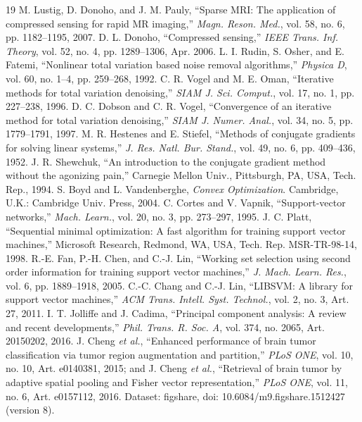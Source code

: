 \documentclass[conference,a4paper]{IEEEtran}
\newcommand{\etal}{\textit{et al.}}
\begin{document}
\begin{thebibliography}{19}
\scriptsize
{} M. Lustig, D. Donoho, and J. M. Pauly, ``Sparse MRI: The application of compressed sensing for rapid MR imaging,'' \emph{Magn. Reson. Med.}, vol. 58, no. 6, pp. 1182--1195, 2007.
 D. L. Donoho, ``Compressed sensing,'' \emph{IEEE Trans. Inf. Theory}, vol. 52, no. 4, pp. 1289--1306, Apr. 2006.
 L. I. Rudin, S. Osher, and E. Fatemi, ``Nonlinear total variation based noise removal algorithms,'' \emph{Physica D}, vol. 60, no. 1--4, pp. 259--268, 1992.
 C. R. Vogel and M. E. Oman, ``Iterative methods for total variation denoising,'' \emph{SIAM J. Sci. Comput.}, vol. 17, no. 1, pp. 227--238, 1996.
 D. C. Dobson and C. R. Vogel, ``Convergence of an iterative method for total variation denoising,'' \emph{SIAM J. Numer. Anal.}, vol. 34, no. 5, pp. 1779--1791, 1997.
 M. R. Hestenes and E. Stiefel, ``Methods of conjugate gradients for solving linear systems,'' \emph{J. Res. Natl. Bur. Stand.}, vol. 49, no. 6, pp. 409--436, 1952.
 J. R. Shewchuk, ``An introduction to the conjugate gradient method without the agonizing pain,'' Carnegie Mellon Univ., Pittsburgh, PA, USA, Tech. Rep., 1994.
 S. Boyd and L. Vandenberghe, \emph{Convex Optimization}. Cambridge, U.K.: Cambridge Univ. Press, 2004.
 C. Cortes and V. Vapnik, ``Support-vector networks,'' \emph{Mach. Learn.}, vol. 20, no. 3, pp. 273--297, 1995.
 J. C. Platt, ``Sequential minimal optimization: A fast algorithm for training support vector machines,'' Microsoft Research, Redmond, WA, USA, Tech. Rep. MSR-TR-98-14, 1998.
 R.-E. Fan, P.-H. Chen, and C.-J. Lin, ``Working set selection using second order information for training support vector machines,'' \emph{J. Mach. Learn. Res.}, vol. 6, pp. 1889--1918, 2005.
 C.-C. Chang and C.-J. Lin, ``LIBSVM: A library for support vector machines,'' \emph{ACM Trans. Intell. Syst. Technol.}, vol. 2, no. 3, Art. 27, 2011.
 I. T. Jolliffe and J. Cadima, ``Principal component analysis: A review and recent developments,'' \emph{Phil. Trans. R. Soc. A}, vol. 374, no. 2065, Art. 20150202, 2016.
 J. Cheng \etal, ``Enhanced performance of brain tumor classification via tumor region augmentation and partition,'' \emph{PLoS ONE}, vol. 10, no. 10, Art. e0140381, 2015; and J. Cheng \etal, ``Retrieval of brain tumor by adaptive spatial pooling and Fisher vector representation,'' \emph{PLoS ONE}, vol. 11, no. 6, Art. e0157112, 2016. Dataset: figshare, doi: 10.6084/m9.figshare.1512427 (version 8).

\end{thebibliography}
\end{document}
